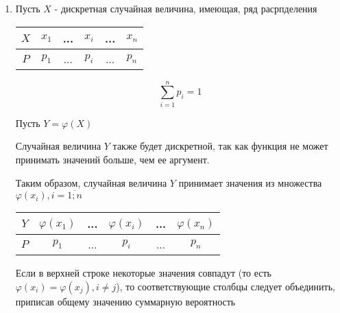 \documentclass[a4paper, 14pt]{report}
\begin{document}
\begin{enumerate}
    \item Пусть $X$ - дискретная случайная величина, имеющая, ряд расрпделения

        \begin{table}[H]
            \centering
            \begin{tabular}{|c||c|c|c|c|c|}
                \hline
                $X$ & $x_1$ & ... & $x_i$ & ... & $x_n$ \\
                \hline
                $P$ & $p_1$ & ... & $p_i$ & ... & $p_n$ \\
                \hline
            \end{tabular}
        \end{table}

        $$
        \sum_{i=1}^n p_i = 1
        $$

        Пусть $Y=\varphi(X)$

        Случайная величина $Y$ также будет дискретной, так как функция не может принимать значений больше, чем ее аргумент.

        Таким образом, случайная величина $Y$ принимает значения из множества $\varphi(x_i), i = \overline{1;n}$

        \begin{table}[H]
            \centering
            \begin{tabular}{|c||c|c|c|c|c|}
                \hline
                $Y$ & $\varphi(x_1)$ & ... & $\varphi(x_i)$ & ... & $\varphi(x_n)$ \\
                \hline
                $P$ & $p_1$ & ... & $p_i$ & ... & $p_n$ \\
                \hline
            \end{tabular}
        \end{table}

        Если в верхней строке некоторые значения совпадут (то есть $\varphi(x_i) = \varphi(x_j), i \ne j$), то соответствующие столбцы следует объединить, приписав общему значению суммарную вероятность
\end{enumerate}
\end{document}

